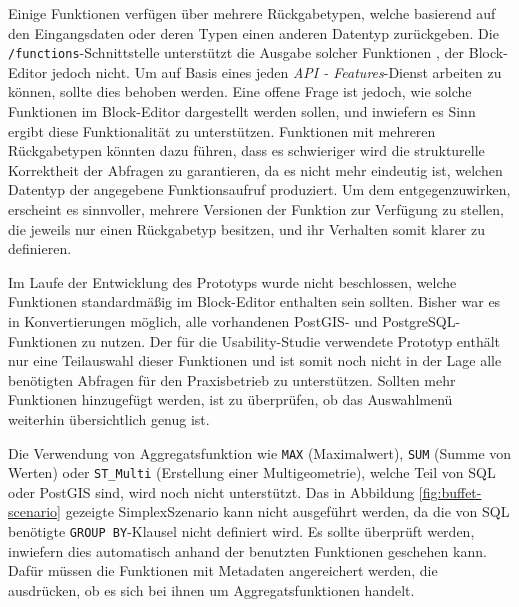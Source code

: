 Einige Funktionen verfügen über mehrere Rückgabetypen, welche basierend auf den Eingangsdaten oder deren Typen einen anderen Datentyp zurückgeben. Die \texttt{/functions}-Schnittstelle unterstützt die Ausgabe solcher Funktionen , der Block-Editor jedoch nicht. Um auf Basis eines jeden \textit{API - Features}-Dienst arbeiten zu können, sollte dies behoben werden. Eine offene Frage ist jedoch, wie solche Funktionen im Block-Editor dargestellt werden sollen, und inwiefern es Sinn ergibt diese Funktionalität zu unterstützen. Funktionen mit mehreren Rückgabetypen könnten dazu führen, dass es schwieriger wird die strukturelle Korrektheit der Abfragen zu garantieren, da es nicht mehr eindeutig ist, welchen Datentyp der angegebene Funktionsaufruf produziert. Um dem entgegenzuwirken, erscheint es sinnvoller, mehrere Versionen der Funktion zur Verfügung zu stellen, die jeweils nur einen Rückgabetyp besitzen, und ihr Verhalten somit klarer zu definieren.

Im Laufe der Entwicklung des Prototyps wurde nicht beschlossen, welche Funktionen standardmäßig im Block-Editor enthalten sein sollten. Bisher war es in Konvertierungen möglich, alle vorhandenen PostGIS- und PostgreSQL-Funktionen zu nutzen. Der für die Usability-Studie verwendete Prototyp enthält nur eine Teilauswahl dieser Funktionen und ist somit noch nicht in der Lage alle benötigten Abfragen für den Praxisbetrieb zu unterstützen. Sollten mehr Funktionen hinzugefügt werden, ist zu überprüfen, ob das Auswahlmenü weiterhin übersichtlich genug ist.

Die Verwendung von Aggregatsfunktion wie \texttt{MAX} (Maximalwert), \texttt{SUM} (Summe von Werten) oder \texttt{ST\_Multi} (Erstellung einer Multigeometrie), welche Teil von \ac{SQL} oder PostGIS sind, wird noch nicht unterstützt. Das in Abbildung \ref{fig:buffet-scenario} gezeigte SimplexSzenario kann nicht ausgeführt werden, da die von \ac{SQL} benötigte \texttt{GROUP BY}-Klausel nicht definiert wird. Es sollte überprüft werden, inwiefern dies automatisch anhand der benutzten Funktionen geschehen kann. Dafür müssen die Funktionen mit Metadaten angereichert werden, die ausdrücken, ob es sich bei ihnen um Aggregatsfunktionen handelt.
